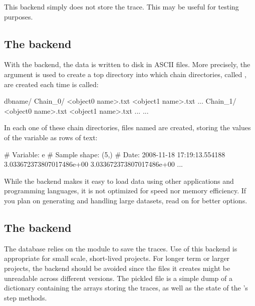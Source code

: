 \documentclass[]{jss}
\begin{document}
This backend simply does not store the trace. This may be useful for testing
purposes.



\subsection[txt]{The  backend}
  \label{txt}%


With the  backend, the data is written to disk in ASCII files.
More precisely, the  argument is used to create a top directory
into which chain directories, called , are created each
time  is called:
%

\begin{CodeInput}
dbname/
  Chain_0/
    <object0 name>.txt
    <object1 name>.txt
    ...
  Chain_1/
    <object0 name>.txt
    <object1 name>.txt
    ...
  ...    
\end{CodeInput}

In each one of these chain directories, files named 
are created, storing the values of the variable as rows of text:
%

\begin{CodeInput}
# Variable: e
# Sample shape: (5,)
# Date: 2008-11-18 17:19:13.554188
3.033672373807017486e+00
3.033672373807017486e+00
...    
\end{CodeInput}

While the  backend makes it easy to load data using other
applications and programming languages, it is not optimized for speed nor
memory efficiency. If you plan on generating and handling large datasets,
read on for better options.



\subsection[pickle]{The  backend}
  \label{pickle}%


The  database relies on the  module to save the
traces. Use of this backend is appropriate for small scale,
short-lived projects. For longer term or larger projects, the 
backend should be avoided since the files it creates might be unreadable
across different  versions. The pickled file is a simple dump of a
dictionary containing the  arrays storing the traces, as well as
the state of the 's step methods.
\end{document}
